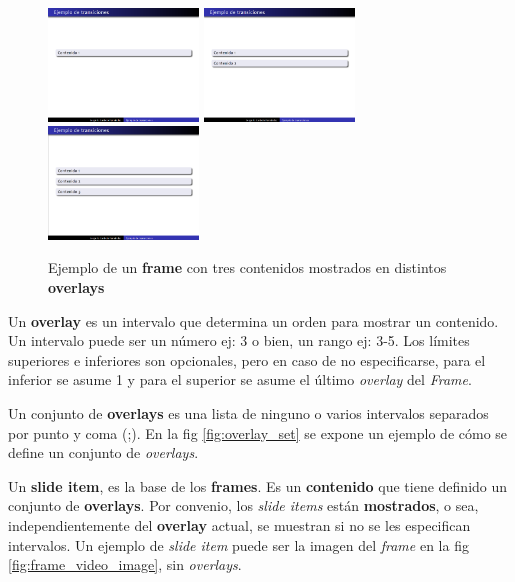  		\begin{figure}[tb]
 			\centering
 			\includegraphics[width=4cm]{img/content1}
 			\includegraphics[width=4cm]{img/content2}
 			\includegraphics[width=4cm]{img/content3}
 			\caption{Ejemplo de un \textbf{frame} con tres contenidos mostrados en distintos \textbf{overlays}}
 			\label{fig:contents} 
 		\end{figure}		

 		\begin{definition}
 		\label{def:overlay}
 			Un \textbf{overlay} es un intervalo que determina un orden para mostrar un contenido. Un intervalo puede ser un número ej: 3 o bien, un rango ej: 3-5. Los límites superiores e inferiores son opcionales, pero en caso de no especificarse, para el inferior se asume 1 y para el superior se asume el último \textit{overlay} del \textit{Frame}.
 		\end{definition}

 		\begin{definition}
 		\label{def:ovaerlay_set}
 			Un conjunto de \textbf{overlays} es una lista de ninguno o varios intervalos separados por punto y coma (;). En la fig \ref{fig:overlay_set} se expone un ejemplo de cómo se define un conjunto de \textit{overlays}.
 		\end{definition} 

 		\begin{definition}
 		\label{def:slide_item}
 			Un \textbf{slide item}, es la base de los \textbf{frames}. Es un \textbf{contenido} que tiene definido un conjunto de \textbf{overlays}. Por convenio, los \textit{slide items} están \textbf{mostrados}, o sea, independientemente del \textbf{overlay} actual, se muestran si no se les especifican intervalos. Un ejemplo de \textit{slide item} puede ser la imagen del \textit{frame} en la fig \ref{fig:frame_video_image}, sin \textit{overlays}.
 		\end{definition}

